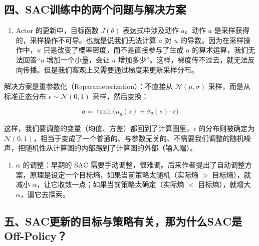 \hypertarget{ux56dbsacux8badux7ec3ux4e2dux7684ux4e24ux4e2aux95eeux9898ux4e0eux89e3ux51b3ux65b9ux6848}{%
\subsection{四、SAC训练中的两个问题与解决方案}\label{ux56dbsacux8badux7ec3ux4e2dux7684ux4e24ux4e2aux95eeux9898ux4e0eux89e3ux51b3ux65b9ux6848}}

\begin{enumerate}
\def\labelenumi{\arabic{enumi}.}
\tightlist
\item
  Actor 的更新中，目标函数 \(J(\theta)\) 表达式中涉及动作 \(a\)。动作 \(a\) 是采样获得的，采样操作不可导。也就是说我们无法计算 \(a\) 对 \(u\) 的导数。因为在采样操作中，\(u\) 只是改变了概率密度，而不是直接参与了生成 \(a\) 的算术运算，我们无法回答``\(u\) 增加一个小量，会让 \(a\) 增加多少''。这样，梯度传不过去，就无法反向传播。但是我们客观上又需要通过梯度来更新采样分布。
\end{enumerate}

解决方案是重参数化（Reparameterization）：不直接从 \(\mathcal{N}(\mu,\sigma)\) 采样，而是从标准正态分布 \(\epsilon\sim\mathcal{N}(0,1)\) 采样，然后变换：

\[
a
=
\tanh\bigl(
\mu_\theta(s)+\sigma_\theta(s)\cdot\epsilon
\bigr)
\]

这样，我们要调整的变量（均值、方差）都回到了计算图里，\(\epsilon\) 的分布则被确定为 \(\mathcal{N}(0,1)\)，相当于变成了一个普通的、与参数无关的、不需要我们调整的随机噪声，把随机性从计算图的内部踢到了计算图的外部（输入端）。

\begin{enumerate}
\def\labelenumi{\arabic{enumi}.}
\setcounter{enumi}{1}
\tightlist
\item
  \(\alpha\) 的调整：早期的 SAC 需要手动调整，很难调。后来作者提出了自动调整方案，原理是设定一个目标熵，如果当前策略太随机（实际熵 \(>\) 目标熵），就减小 \(\alpha\)，让它收敛一点；如果当前策略太确定（实际熵 \(<\) 目标熵），就增大 \(\alpha\)，逼它去探索。
\end{enumerate}

\hypertarget{ux4e94sacux66f4ux65b0ux7684ux76eeux6807ux4e0eux7b56ux7565ux6709ux5173ux90a3ux4e3aux4ec0ux4e48sacux662foff-policy}{%
\subsection{五、SAC更新的目标与策略有关，那为什么SAC是Off-Policy？}\label{ux4e94sacux66f4ux65b0ux7684ux76eeux6807ux4e0eux7b56ux7565ux6709ux5173ux90a3ux4e3aux4ec0ux4e48sacux662foff-policy}}

